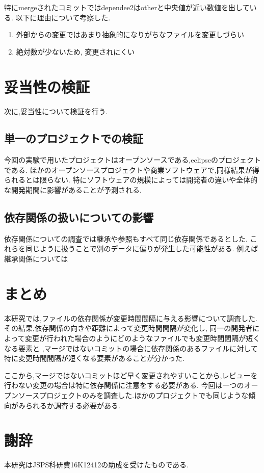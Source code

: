 \documentclass{fose2016}           %
\begin{document}
特にmergeされたコミットではdependee2はotherと中央値が近い数値を出している.
以下に理由について考察した.

\begin{enumerate}
\item 外部からの変更ではあまり抽象的になりがちなファイルを変更しづらい
\item 絶対数が少ないため, 変更されにくい
\end{enumerate}

\section{妥当性の検証}\label{妥当性の検証}
次に,妥当性について検証を行う.

\subsection{単一のプロジェクトでの検証}
今回の実験で用いたプロジェクトはオープンソースである,eclipseのプロジェクトである.
ほかのオープンソースプロジェクトや商業ソフトウェアで,同様結果が得られるとは限らない.
特にソフトウェアの規模によっては開発者の違いや全体的な開発期間に影響があることが予測される.

\subsection{依存関係の扱いについての影響}
依存関係についての調査では継承や参照もすべて同じ依存関係であるとした.
これらを同じように扱うことで別のデータに偏りが発生した可能性がある.
例えば継承関係については

\section{まとめ} \label{まとめ}
本研究では,ファイルの依存関係が変更時間間隔に与える影響について調査した.
その結果,依存関係の向きや距離によって変更時間間隔が変化し,
同一の開発者によって変更が行われた場合のようにどのようなファイルでも変更時間間隔が短くなる要素と
,マージではないコミットの場合に依存関係のあるファイルに対して特に変更時間間隔が短くなる要素があることが分かった.

ここから,マージではないコミットほど早く変更されやすいことから,レビューを行わない変更の場合は特に依存関係に注意をする必要がある.
今回は一つのオープンソースプロジェクトのみを調査した.ほかのプロジェクトでも同じような傾向がみられるか調査する必要がある.

\section*{謝辞}
本研究はJSPS科研費16K12412の助成を受けたものである.
\end{document}
